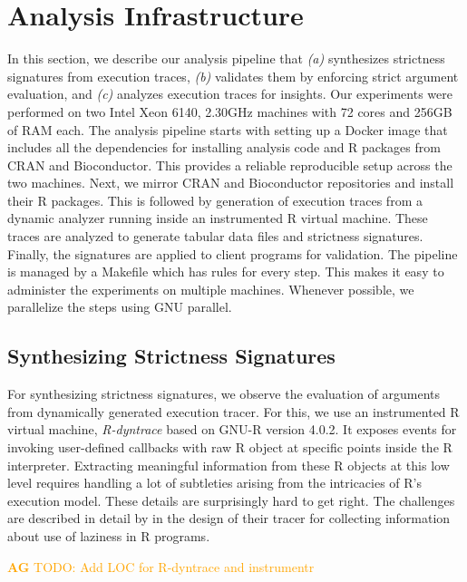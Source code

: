\documentclass[screen,acmsmall]{acmart}
\newcommand{\authorcomment}[3]{\xspace\textcolor{#1}{{\bf #2} #3}\xspace} %
\newcommand{\AG}[1]{\authorcomment{orange}{AG}{#1}}
\begin{document}
\section{Analysis Infrastructure}
In this section, we describe our analysis pipeline that \emph{(a)} synthesizes
strictness signatures from execution traces, \emph{(b)} validates them by
enforcing strict argument evaluation, and \emph{(c)} analyzes execution traces
for insights. Our experiments were performed on two Intel Xeon 6140, 2.30GHz
machines with 72 cores and 256GB of RAM each. The analysis pipeline starts with
setting up a Docker image that includes all the dependencies for installing
analysis code and R packages from CRAN and Bioconductor. This provides a
reliable reproducible setup across the two machines. Next, we mirror CRAN and
Bioconductor\cite{bioc} repositories and install their R packages. This is
followed by generation of execution traces from a dynamic analyzer running
inside an instrumented R virtual machine. These traces are analyzed to generate
tabular data files and strictness signatures. Finally, the signatures are
applied to client programs for validation. The pipeline is managed by a Makefile
which has rules for every step. This makes it easy to administer the experiments
on multiple machines. Whenever possible, we parallelize the steps using GNU
parallel\cite{tange2011a}.

\subsection{Synthesizing Strictness Signatures}

For synthesizing strictness signatures, we observe the evaluation of arguments
from dynamically generated execution tracer. For this, we use an instrumented R
virtual machine, \emph{R-dyntrace} \citet{oopsla19b} based on GNU-R version
4.0.2. It exposes events for invoking user-defined callbacks with raw R object
at specific points inside the R interpreter. Extracting meaningful information
from these R objects at this low level requires handling a lot of subtleties
arising from the intricacies of R's execution model. These details are
surprisingly hard to get right. The challenges are described in detail by
\cite{oopsla19b} in the design of their tracer for collecting information about
use of laziness in R programs.

\AG{TODO: Add LOC for R-dyntrace and instrumentr}
\end{document}
